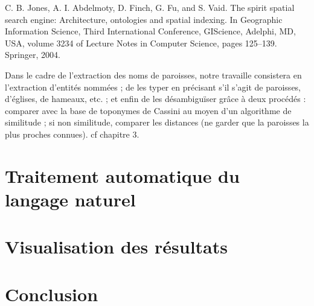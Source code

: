 \documentclass[a4paper]{book}
\begin{document}
C. B. Jones, A. I. Abdelmoty, D. Finch, G. Fu, and
S. Vaid. The spirit spatial search engine: Architecture,
ontologies and spatial indexing. In Geographic
Information Science, Third International Conference,
GIScience, Adelphi, MD, USA, volume 3234 of Lecture
Notes in Computer Science, pages 125–139. Springer,
2004.




\bigbreak

Dans le cadre de l'extraction des noms de paroisses, notre travaille consistera en l'extraction d'entités nommées ; de les typer en précisant s'il s'agit de paroisses, d'églises, de hameaux, etc. ; et enfin de les désambiguïser grâce à deux procédés : comparer avec la base de toponymes de Cassini au moyen d'un algorithme de similitude ; si non similitude, comparer les distances (ne garder que la paroisses la plus proches connues). cf chapitre 3.




\newpage
\chapter{Traitement automatique du langage naturel}






\newpage
\chapter{Visualisation des résultats}





\backmatter
\newpage
\chapter{Conclusion}



\end{document}
